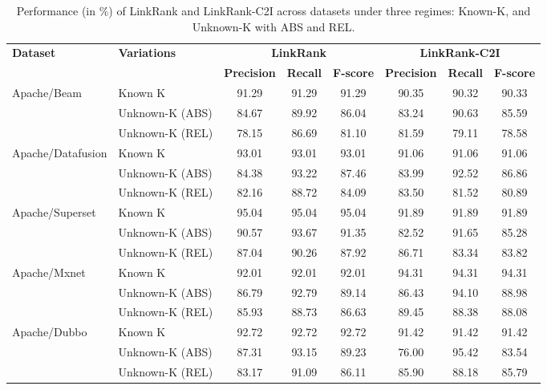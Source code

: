 \begin{table}[htbp]
\centering
\caption{Performance (in \%) of LinkRank and LinkRank-C2I across datasets under three regimes: Known-K, and Unknown-K with ABS and REL.}
\renewcommand{\arraystretch}{1.3}
\label{rq2}
\begin{tabular}{@{}llcccccc@{}}
\toprule
\multirow{2}{*}{\textbf{Dataset}} & \multirow{2}{*}{\textbf{Variations}} & \multicolumn{3}{c}{\textbf{LinkRank}} & \multicolumn{3}{c}{\textbf{LinkRank-C2I}} \\
\cmidrule(lr){3-5} \cmidrule(lr){6-8}
 &  & \textbf{Precision} & \textbf{Recall} & \textbf{F-score} & \textbf{Precision} & \textbf{Recall} & \textbf{F-score} \\
\midrule

\multirow{3}{*}{Apache/Beam}
 & Known K         & 91.29 & 91.29 & 91.29 & 90.35 & 90.32 & 90.33 \\
 & Unknown-K (ABS) & 84.67 & 89.92 & 86.04 & 83.24 & 90.63 & 85.59 \\
 & Unknown-K (REL) & 78.15 & 86.69 & 81.10 & 81.59 & 79.11 & 78.58 \\
\midrule

\multirow{3}{*}{Apache/Datafusion}
 & Known K         & 93.01 & 93.01 & 93.01 & 91.06 & 91.06 & 91.06 \\
 & Unknown-K (ABS) & 84.38 & 93.22 & 87.46 & 83.99 & 92.52 & 86.86 \\
 & Unknown-K (REL) & 82.16 & 88.72 & 84.09 & 83.50 & 81.52 & 80.89 \\
\midrule

\multirow{3}{*}{Apache/Superset}
 & Known K         & 95.04 & 95.04 & 95.04 & 91.89 & 91.89 & 91.89 \\
 & Unknown-K (ABS) & 90.57 & 93.67 & 91.35 & 82.52 & 91.65 & 85.28 \\
 & Unknown-K (REL) & 87.04 & 90.26 & 87.92 & 86.71 & 83.34 & 83.82 \\
\midrule

\multirow{3}{*}{Apache/Mxnet}
 & Known K         & 92.01 & 92.01 & 92.01 & 94.31 & 94.31 & 94.31 \\
 & Unknown-K (ABS) & 86.79 & 92.79 & 89.14 & 86.43 & 94.10 & 88.98 \\
 & Unknown-K (REL) & 85.93 & 88.73 & 86.63 & 89.45 & 88.38 & 88.08 \\
\midrule

\multirow{3}{*}{Apache/Dubbo}
 & Known K         & 92.72 & 92.72 & 92.72 & 91.42 & 91.42 & 91.42 \\
 & Unknown-K (ABS) & 87.31 & 93.15 & 89.23 & 76.00 & 95.42 & 83.54 \\
 & Unknown-K (REL) & 83.17 & 91.09 & 86.11 & 85.90 & 88.18 & 85.79 \\
\midrule


\end{tabular}
\end{table}
